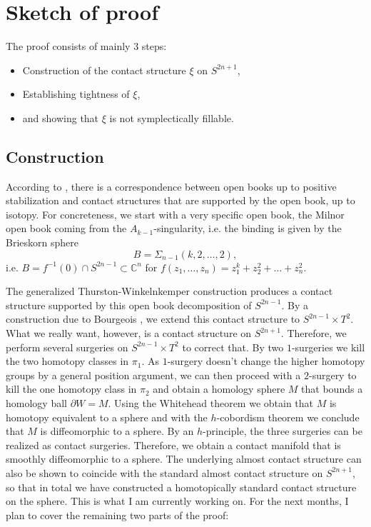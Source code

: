 \documentclass{amsart}
\begin{document}
\section*{Sketch of proof}
The proof consists of mainly 3 steps:
\begin{itemize}
    \item Construction of the contact structure $\xi$ on $S^{2n+1}$,
    \item Establishing tightness of $\xi$,
    \item and showing that $\xi$ is not symplectically fillable.
\end{itemize}
\subsection*{Construction}
According to \cite{Giroux02}, there is a correspondence between open books up to positive
stabilization and contact structures that are supported by the open book, up to isotopy.
For concreteness, we start with a very specific open book, the Milnor open book coming from
the $A_{k-1}$-singularity, i.e. the binding is given by the Brieskorn sphere 
\[
    B = \Sigma_{n-1}(k,2,\dots,2),
\]
i.e. $B = f^{-1}(0) \cap S^{2n-1} \subset \mathbb C^n$ for $f(z_1, \dots, z_n) = z_1^k + z_2^2 + \dots + z_n^2$.

The generalized Thurston-Winkelnkemper construction produces a contact structure supported by
this open book decomposition of $S^{2n-1}$.
By a construction due to Bourgeois \cite{Bourgeois02}, we extend this contact structure to 
$S^{2n-1} \times T^2$.
What we really want, however, is a contact structure on $S^{2n+1}$. Therefore,
we perform several surgeries on $S^{2n-1}\times T^2$ to correct that.
By two $1$-surgeries we kill the two homotopy classes in $\pi_1$.
As $1$-surgery doesn't change the higher homotopy groups by a general position argument,
we can then proceed with a $2$-surgery to kill the one homotopy class in $\pi_2$
and obtain a homology sphere $M$ that bounds a homology ball $\partial W = M$.
Using the Whitehead theorem we obtain that $M$ is homotopy equivalent to a sphere 
and with the $h$-cobordism theorem we conclude that $M$ is diffeomorphic to a sphere.
By an $h$-principle, the three surgeries can be realized as contact surgeries.
Therefore, we obtain a contact manifold that is smoothly diffeomorphic to a sphere.
The underlying almost contact structure can also be shown to coincide with the standard almost
contact structure on $S^{2n+1}$, so that in total we have constructed a
homotopically standard contact structure on the sphere.
This is what I am currently working on. For the next months, I plan to cover the remaining
two parts of the proof:
\end{document}
